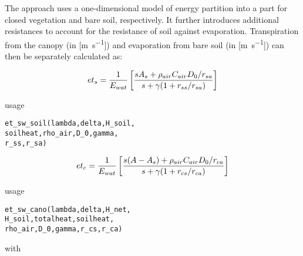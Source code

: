The approach uses a one-dimensional model of energy partition into a part for closed vegetation and bare soil, respectively. It further introduces additional resistances to account for the resistance of soil against evaporation. Transpiration from the canopy \etTransp{} (in [\si{\metre\per\second}]) and evaporation from bare soil \etEvap{} (in [\si{\metre\per\second}]) can then be separately calculated as:

\begin{multline} \label{eqn:et:sw_ets}
et_{s} =  \frac{1}{E_{wat}} \left[ \frac{s A_s + \rho_{air} C_{air} D_0 / r_{sa}}{s + \gamma (1 + r_{ss} / r_{sa})} \right]
\end{multline}

\noindent
usage
\begin{verbatim}
et_sw_soil(lambda,delta,H_soil,
soilheat,rho_air,D_0,gamma,
r_ss,r_sa)
\end{verbatim}

\begin{multline} \label{eqn:et:sw_etc}
et_{c} =  \frac{1}{E_{wat}} \left[ \frac{s (A - A_s) + \rho_{air} C_{air} D_0 / r_{ca}}{s + \gamma (1 + r_{cs} / r_{ca})} \right]
\end{multline}

\noindent
usage
\begin{verbatim}
et_sw_cano(lambda,delta,H_net,
H_soil,totalheat,soilheat,
rho_air,D_0,gamma,r_cs,r_ca)
\end{verbatim}

\noindent
with\\ \vspace*{2ex}

